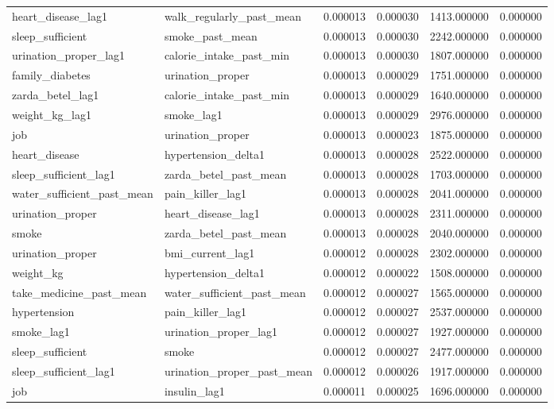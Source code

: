 \begin{longtable}{llrrrr}
heart\_disease\_lag1 & walk\_regularly\_past\_mean & 0.000013 & 0.000030 & 1413.000000 & 0.000000 \\
sleep\_sufficient & smoke\_past\_mean & 0.000013 & 0.000030 & 2242.000000 & 0.000000 \\
urination\_proper\_lag1 & calorie\_intake\_past\_min & 0.000013 & 0.000030 & 1807.000000 & 0.000000 \\
family\_diabetes & urination\_proper & 0.000013 & 0.000029 & 1751.000000 & 0.000000 \\
zarda\_betel\_lag1 & calorie\_intake\_past\_min & 0.000013 & 0.000029 & 1640.000000 & 0.000000 \\
weight\_kg\_lag1 & smoke\_lag1 & 0.000013 & 0.000029 & 2976.000000 & 0.000000 \\
job & urination\_proper & 0.000013 & 0.000023 & 1875.000000 & 0.000000 \\
heart\_disease & hypertension\_delta1 & 0.000013 & 0.000028 & 2522.000000 & 0.000000 \\
sleep\_sufficient\_lag1 & zarda\_betel\_past\_mean & 0.000013 & 0.000028 & 1703.000000 & 0.000000 \\
water\_sufficient\_past\_mean & pain\_killer\_lag1 & 0.000013 & 0.000028 & 2041.000000 & 0.000000 \\
urination\_proper & heart\_disease\_lag1 & 0.000013 & 0.000028 & 2311.000000 & 0.000000 \\
smoke & zarda\_betel\_past\_mean & 0.000013 & 0.000028 & 2040.000000 & 0.000000 \\
urination\_proper & bmi\_current\_lag1 & 0.000012 & 0.000028 & 2302.000000 & 0.000000 \\
weight\_kg & hypertension\_delta1 & 0.000012 & 0.000022 & 1508.000000 & 0.000000 \\
take\_medicine\_past\_mean & water\_sufficient\_past\_mean & 0.000012 & 0.000027 & 1565.000000 & 0.000000 \\
hypertension & pain\_killer\_lag1 & 0.000012 & 0.000027 & 2537.000000 & 0.000000 \\
smoke\_lag1 & urination\_proper\_lag1 & 0.000012 & 0.000027 & 1927.000000 & 0.000000 \\
sleep\_sufficient & smoke & 0.000012 & 0.000027 & 2477.000000 & 0.000000 \\
sleep\_sufficient\_lag1 & urination\_proper\_past\_mean & 0.000012 & 0.000026 & 1917.000000 & 0.000000 \\
job & insulin\_lag1 & 0.000011 & 0.000025 & 1696.000000 & 0.000000 \\

\end{longtable}
